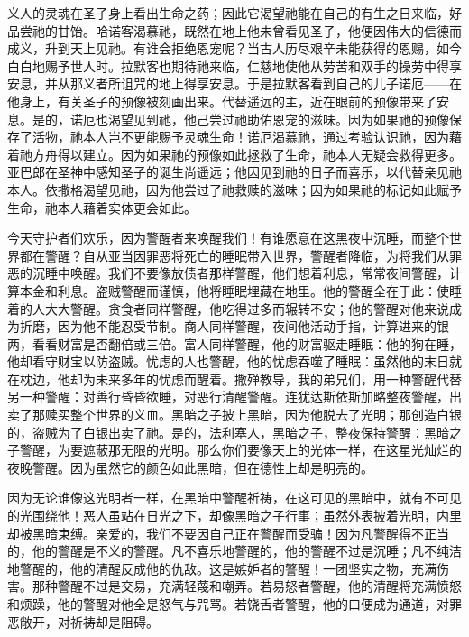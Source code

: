 义人的灵魂在圣子身上看出生命之药；因此它渴望祂能在自己的有生之日来临，好品尝祂的甘饴。哈诺客渴慕祂，既然在地上他未曾看见圣子，他便因伟大的信德而成义，升到天上见祂。有谁会拒绝恩宠呢？当古人历尽艰辛未能获得的恩赐，如今白白地赐予世人时。拉默客也期待祂来临，仁慈地使他从劳苦和双手的操劳中得享安息，并从那义者所诅咒的地上得享安息。于是拉默客看到自己的儿子诺厄——在他身上，有关圣子的预像被刻画出来。代替遥远的主，近在眼前的预像带来了安息。是的，诺厄也渴望见到祂，他己尝过祂助佑恩宠的滋味。因为如果祂的预像保存了活物，祂本人岂不更能赐予灵魂生命！诺厄渴慕祂，通过考验认识祂，因为藉着祂方舟得以建立。因为如果祂的预像如此拯救了生命，祂本人无疑会救得更多。亚巴郎在圣神中感知圣子的诞生尚遥远；他因见到祂的日子而喜乐，以代替亲见祂本人。依撒格渴望见祂，因为他尝过了祂救赎的滋味；因为如果祂的标记如此赋予生命，祂本人藉着实体更会如此。\par

今天守护者们欢乐，因为警醒者来唤醒我们！有谁愿意在这黑夜中沉睡，而整个世界都在警醒？自从亚当因罪恶将死亡的睡眠带入世界，警醒者降临，为将我们从罪恶的沉睡中唤醒。我们不要像放债者那样警醒，他们想着利息，常常夜间警醒，计算本金和利息。盗贼警醒而谨慎，他将睡眠埋藏在地里。他的警醒全在于此：使睡着的人大大警醒。贪食者同样警醒，他吃得过多而辗转不安；他的警醒对他来说成为折磨，因为他不能忍受节制。商人同样警醒，夜间他活动手指，计算进来的银两，看看财富是否翻倍或三倍。富人同样警醒，他的财富驱走睡眠：他的狗在睡，他却看守财宝以防盗贼。忧虑的人也警醒，他的忧虑吞噬了睡眠：虽然他的末日就在枕边，他却为未来多年的忧虑而醒着。撒殚教导，我的弟兄们，用一种警醒代替另一种警醒：对善行昏昏欲睡，对恶行清醒警醒。连犹达斯依斯加略整夜警醒，出卖了那赎买整个世界的义血。黑暗之子披上黑暗，因为他脱去了光明；那创造白银的，盗贼为了白银出卖了祂。是的，法利塞人，黑暗之子，整夜保持警醒：黑暗之子警醒，为要遮蔽那无限的光明。那么你们要像天上的光体一样，在这星光灿烂的夜晚警醒。因为虽然它的颜色如此黑暗，但在德性上却是明亮的。\par

因为无论谁像这光明者一样，在黑暗中警醒祈祷，在这可见的黑暗中，就有不可见的光围绕他！恶人虽站在日光之下，却像黑暗之子行事；虽然外表披着光明，内里却被黑暗束缚。亲爱的，我们不要因自己正在警醒而受骗！因为凡警醒得不正当的，他的警醒是不义的警醒。凡不喜乐地警醒的，他的警醒不过是沉睡；凡不纯洁地警醒的，他的清醒反成他的仇敌。这是嫉妒者的警醒！一团坚实之物，充满伤害。那种警醒不过是交易，充满轻蔑和嘲弄。若易怒者警醒，他的清醒将充满愤怒和烦躁，他的警醒对他全是怒气与咒骂。若饶舌者警醒，他的口便成为通道，对罪恶敞开，对祈祷却是阻碍。\par

